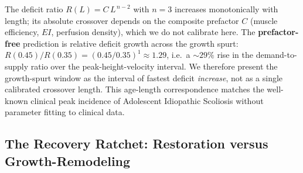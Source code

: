 The deficit ratio $R(L)=C\,L^{\,n-2}$ with $n=3$ increases monotonically with length; its absolute crossover depends on the composite prefactor $C$ (muscle efficiency, $EI$, perfusion density), which we do not calibrate here. The \textbf{prefactor-free} prediction is relative deficit growth across the growth spurt: $R(0.45)/R(0.35)=(0.45/0.35)^{1}\approx 1.29$, i.e.\ a ${\sim}29\%$ rise in the demand-to-supply ratio over the peak-height-velocity interval. We therefore present the growth-spurt window as the interval of fastest deficit \emph{increase}, not as a single calibrated crossover length. This age-length correspondence matches the well-known clinical peak incidence of Adolescent Idiopathic Scoliosis without parameter fitting to clinical data.

\subsection{The Recovery Ratchet: Restoration versus Growth-Remodeling}

